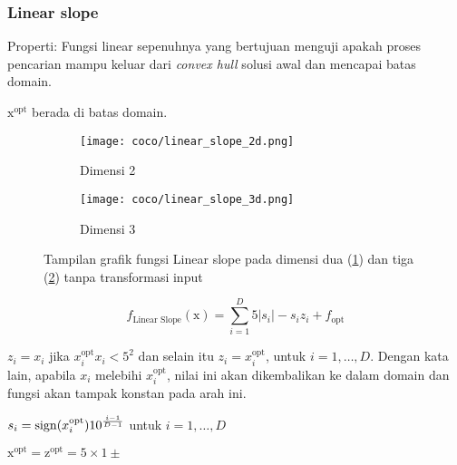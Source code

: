 \subsubsection{Linear slope}
\noindent Properti:
Fungsi linear sepenuhnya yang bertujuan menguji apakah proses pencarian mampu keluar dari \textit{convex hull} solusi awal dan mencapai batas domain.
\begin{packed_item}
  \item $\mathrm{x}^{\text{opt}}$ berada di batas domain.
\end{packed_item}
\begin{figure}[H]
	\centering
	\begin{subfigure}[b]{0.4\textwidth}
		\centering
		\texttt{[image: coco/linear\_slope\_2d.png]}
		\caption{Dimensi 2}
		\label{fig:linear_slope_2d}
	\end{subfigure}
	\hfill
	\begin{subfigure}[b]{0.4\textwidth}
		\centering
		\texttt{[image: coco/linear\_slope\_3d.png]}
		\caption{Dimensi 3}
		\label{fig:linear_slope_3d}
	\end{subfigure}
	\caption{Tampilan grafik fungsi Linear slope pada dimensi dua (\cref{fig:linear_slope_2d}) dan tiga (\cref{fig:linear_slope_3d}) tanpa transformasi input}
	\label{fig:linear_slope}
\end{figure}
\begin{equation}
  f_{\text{Linear Slope}}(\mathrm{x})=\sum_{i=1}^{D}5|s_i|-s_iz_i+f_{\text{opt}}
\end{equation}
\begin{packed_item}
    \item $z_i=x_i$ jika $x_i^{\text{opt}}x_i < 5^2$ dan selain itu $z_i=x_i^{\text{opt}}$, untuk $i=1,\ldots,D$. Dengan kata lain, apabila $x_i$ melebihi $x_i^{\text{opt}}$, nilai ini akan dikembalikan ke dalam domain dan fungsi akan tampak konstan pada arah ini.
    \item $s_i=\operatorname{sign}(x_i^{\text{opt}})10^{\frac{i-1}{D-1}}$ untuk $i=1,\ldots,D$
    \item $\mathrm{x}^{\text{opt}}=\mathrm{z}^{\text{opt}}=5\times 1 \pm$
\end{packed_item}

